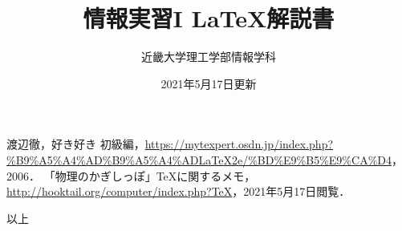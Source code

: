 \documentclass[a4j]{jsarticle}
\begin{document}
\title{情報実習I \LaTeX 解説書}
\date{2021年5月17日更新}
\author{近畿大学理工学部情報学科}

\maketitle

\tableofcontents

\newpage








\begin{thebibliography}{1}
    渡辺徹，好き好き \LaTeXe 初級編，\url{https://mytexpert.osdn.jp/index.php?%B9%A5%A4%AD%B9%A5%A4%ADLaTeX2e/%BD%E9%B5%E9%CA%D4}，2006．
    「物理のかぎしっぽ」\TeX に関するメモ，\url{http://hooktail.org/computer/index.php?TeX}，2021年5月17日閲覧．
\end{thebibliography}

\begin{flushright}
以上
\end{flushright}
\end{document}
